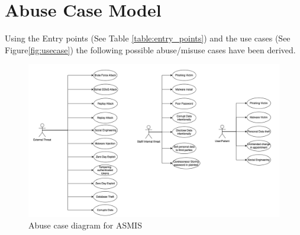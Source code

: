 \section{Abuse Case Model}
Using the Entry points (See Table \ref{table:entry_points}) and the use cases (See Figure\ref{fig:usecase}) the following possible abuse/misuse cases have been derived.

\begin{figure}[h!]
\centering
\includegraphics[width=\textwidth]{pics/abusecase.png}
\caption{Abuse case diagram for ASMIS}\label{fig:abuse_case}
\end{figure}
